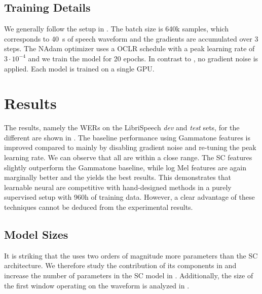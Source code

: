 \documentclass{INTERSPEECH2023}
\begin{document}
\subsection{Training Details}
We generally follow the setup in \cite{zhou2022efficient}.
The batch size is 640k samples, which corresponds to \SI{40}{\second} of speech waveform and the gradients are accumulated over 3 steps.
The NAdam optimizer uses a \gls{OCLR} schedule with a peak learning rate of $3\cdot 10^{-4}$ and we train the model for 20 epochs.
In contrast to \cite{zhou2022efficient}, no gradient noise is applied.
Each model is trained on a single \gls{GPU}.

\section{Results}
The results, namely the \glspl{WER} on the LibriSpeech \textit{dev} and \textit{test} sets, for the different \fes are shown in .
The baseline performance using Gammatone features is improved compared to \cite{zhou2022efficient} mainly by disabling gradient noise and re-tuning the peak learning rate.
We can observe that all \fes are within a close range.
The \gls{SC} features slightly outperform the Gammatone baseline, while log Mel features are again marginally better and the \wvtwo \fe yields the best results.
This demonstrates that learnable neural \fes are competitive with hand-designed methods in a purely supervised setup with 960h of training data.
However, a clear advantage of these techniques cannot be deduced from the experimental results.


\subsection{Model Sizes}
It is striking that the \wvtwo \fe uses two orders of magnitude more parameters than the \gls{SC} architecture.
We therefore study the contribution of its components in  and increase the number of parameters in the \gls{SC} model in .
Additionally, the size of the first window operating on the waveform is analyzed in .
\end{document}
